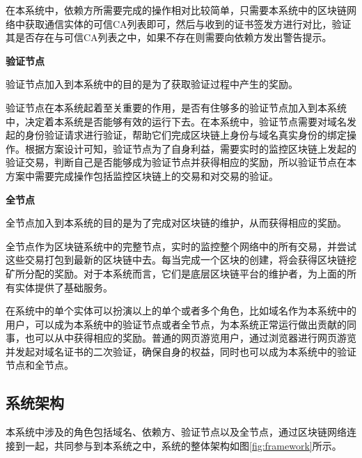 在本系统中，依赖方所需要完成的操作相对比较简单，只需要本系统中的区块链网络中获取通信实体的可信CA列表即可，然后与收到的证书签发方进行对比，验证其是否存在与可信CA列表之中，如果不存在则需要向依赖方发出警告提示。


\noindent\textbf{验证节点}

验证节点加入到本系统中的目的是为了获取验证过程中产生的奖励。

验证节点在本系统起着至关重要的作用，是否有住够多的验证节点加入到本系统中，决定着本系统是否能够有效的运行下去。在本系统中，验证节点需要对域名发起的身份验证请求进行验证，帮助它们完成区块链上身份与域名真实身份的绑定操作。根据方案设计可知，验证节点为了自身利益，需要实时的监控区块链上发起的验证交易，判断自己是否能够成为验证节点并获得相应的奖励，所以验证节点在本方案中需要完成操作包括监控区块链上的交易和对交易的验证。

\noindent\textbf{全节点}

全节点加入到本系统的目的是为了完成对区块链的维护，从而获得相应的奖励。

全节点作为区块链系统中的完整节点，实时的监控整个网络中的所有交易，并尝试这些交易打包到最新的区块链中去。每当完成一个区块的创建，将会获得区块链挖矿所分配的奖励。对于本系统而言，它们是底层区块链平台的维护者，为上面的所有实体提供了基础服务。


在系统中的单个实体可以扮演以上的单个或者多个角色，比如域名作为本系统中的用户，可以成为本系统中的验证节点或者全节点，为本系统正常运行做出贡献的同事，也可以从中获得相应的奖励。普通的网页游览用户，通过浏览器进行网页游览并发起对域名证书的二次验证，确保自身的权益，同时也可以成为本系统中的验证节点和全节点。



\subsection{系统架构}


本系统中涉及的角色包括域名、依赖方、验证节点以及全节点，通过区块链网络连接到一起，共同参与到本系统之中，系统的整体架构如图\ref{fig:framework}所示。




